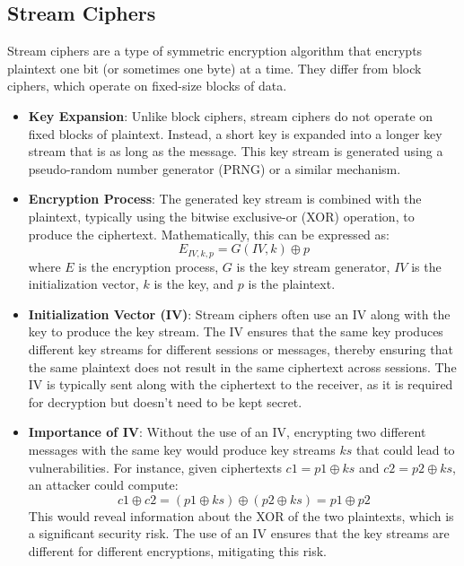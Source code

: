 \documentclass[12pt]{article}
\begin{document}
\subsection*{Stream Ciphers}

Stream ciphers are a type of symmetric encryption algorithm that encrypts plaintext one bit (or sometimes one byte) at a time. They differ from block ciphers, which operate on fixed-size blocks of data.

\begin{itemize}
    \item \textbf{Key Expansion}: Unlike block ciphers, stream ciphers do not operate on fixed blocks of plaintext. Instead, a short key is expanded into a longer key stream that is as long as the message. This key stream is generated using a pseudo-random number generator (PRNG) or a similar mechanism.

    \item \textbf{Encryption Process}: The generated key stream is combined with the plaintext, typically using the bitwise exclusive-or (XOR) operation, to produce the ciphertext. Mathematically, this can be expressed as:
    \[
    E_{IV, k, p} = G(IV, k) \oplus p
    \]
    where \( E \) is the encryption process, \( G \) is the key stream generator, \( IV \) is the initialization vector, \( k \) is the key, and \( p \) is the plaintext.

    \item \textbf{Initialization Vector (IV)}: Stream ciphers often use an IV along with the key to produce the key stream. The IV ensures that the same key produces different key streams for different sessions or messages, thereby ensuring that the same plaintext does not result in the same ciphertext across sessions. The IV is typically sent along with the ciphertext to the receiver, as it is required for decryption but doesn't need to be kept secret.

    \item \textbf{Importance of IV}: Without the use of an IV, encrypting two different messages with the same key would produce key streams \( ks \) that could lead to vulnerabilities. For instance, given ciphertexts \( c1 = p1 \oplus ks \) and \( c2 = p2 \oplus ks \), an attacker could compute:
    \[
    c1 \oplus c2 = (p1 \oplus ks) \oplus (p2 \oplus ks) = p1 \oplus p2
    \]
    This would reveal information about the XOR of the two plaintexts, which is a significant security risk. The use of an IV ensures that the key streams are different for different encryptions, mitigating this risk.
\end{itemize}
\end{document}
